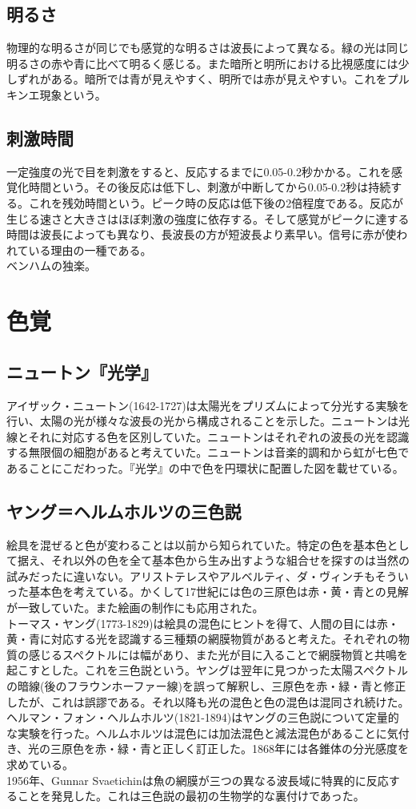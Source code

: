 		\subsection{明るさ}
			物理的な明るさが同じでも感覚的な明るさは波長によって異なる。緑の光は同じ明るさの赤や青に比べて明るく感じる。また暗所と明所における比視感度には少しずれがある。暗所では青が見えやすく、明所では赤が見えやすい。これをプルキンエ現象という。
		\subsection{刺激時間}
			一定強度の光で目を刺激をすると、反応するまでに0.05-0.2秒かかる。これを感覚化時間という。その後反応は低下し、刺激が中断してから0.05-0.2秒は持続する。これを残効時間という。ピーク時の反応は低下後の2倍程度である。反応が生じる速さと大きさはほぼ刺激の強度に依存する。そして感覚がピークに達する時間は波長によっても異なり、長波長の方が短波長より素早い。信号に赤が使われている理由の一種である。\\
			ベンハムの独楽。
	\section{色覚}
		\subsection{ニュートン『光学』}
			アイザック・ニュートン(1642-1727)は太陽光をプリズムによって分光する実験を行い、太陽の光が様々な波長の光から構成されることを示した。ニュートンは光線とそれに対応する色を区別していた。ニュートンはそれぞれの波長の光を認識する無限個の細胞があると考えていた。ニュートンは音楽的調和から虹が七色であることにこだわった。『光学』の中で色を円環状に配置した図を載せている。
		\subsection{ヤング＝ヘルムホルツの三色説}
			絵具を混ぜると色が変わることは以前から知られていた。特定の色を基本色として据え、それ以外の色を全て基本色から生み出すような組合せを探すのは当然の試みだったに違いない。アリストテレスやアルベルティ、ダ・ヴィンチもそういった基本色を考えている。かくして17世紀には色の三原色は赤・黄・青との見解が一致していた。また絵画の制作にも応用された。\\
			トーマス・ヤング(1773-1829)は絵具の混色にヒントを得て、人間の目には赤・黄・青に対応する光を認識する三種類の網膜物質があると考えた。それぞれの物質の感じるスペクトルには幅があり、また光が目に入ることで網膜物質と共鳴を起こすとした。これを三色説という。ヤングは翌年に見つかった太陽スペクトルの暗線(後のフラウンホーファー線)を誤って解釈し、三原色を赤・緑・青と修正したが、これは誤謬である。それ以降も光の混色と色の混色は混同され続けた。\\
			ヘルマン・フォン・ヘルムホルツ(1821-1894)はヤングの三色説について定量的な実験を行った。ヘルムホルツは混色には加法混色と減法混色があることに気付き、光の三原色を赤・緑・青と正しく訂正した。1868年には各錐体の分光感度を求めている。\\
			1956年、Gunnar Svaetichinは魚の網膜が三つの異なる波長域に特異的に反応することを発見した。これは三色説の最初の生物学的な裏付けであった。\\

